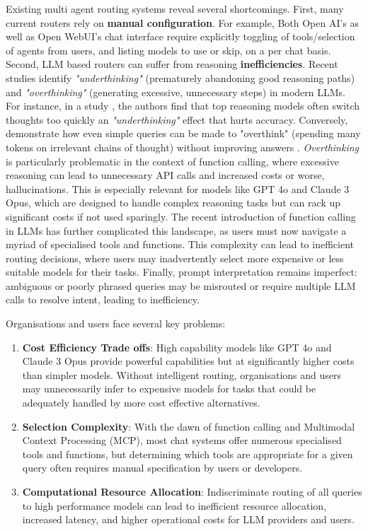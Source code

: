 Existing multi agent routing systems reveal several shortcomings. First, many current routers rely on \textbf{manual configuration}. For example, Both Open AI's as well as Open WebUI's chat interface require explicitly toggling of tools/selection of agents from users, and listing models to use or skip, on a per chat basis. Second, LLM based routers can suffer from reasoning \textbf{inefficiencies}. Recent studies identify \textit{"underthinking"} (prematurely abandoning good reasoning paths) and \textit{"overthinking"} (generating excessive, unnecessary steps) in modern LLMs. For instance, in a study \cite{wang2025thoughtsplaceunderthinkingo1like}, the authors find that top reasoning models often switch thoughts too quickly an \textit{"underthinking"} effect that hurts accuracy. Conversely, \cite{kumar2025overthinkslowdownattacksreasoning} demonstrate how even simple queries can be made to "overthink" (spending many tokens on irrelevant chains of thought) without improving answers . \textit{Overthinking} is particularly problematic in the context of function calling, where excessive reasoning can lead to unnecessary API calls and increased costs or worse, hallucinations. This is especially relevant for models like GPT 4o and Claude 3 Opus, which are designed to handle complex reasoning tasks but can rack up significant costs if not used sparingly. The recent introduction of function calling in LLMs has further complicated this landscape, as users must now navigate a myriad of specialised tools and functions. This complexity can lead to inefficient routing decisions, where users may inadvertently select more expensive or less suitable models for their tasks. Finally, prompt interpretation remains imperfect: ambiguous or poorly phrased queries may be misrouted or require multiple LLM calls to resolve intent, leading to inefficiency.

Organisations and users face several key problems:
\begin{enumerate}
    \item \textbf{Cost Efficiency Trade offs}: High capability models like GPT 4o and Claude 3 Opus provide powerful capabilities but at significantly higher costs than simpler models. Without intelligent routing, organisations and users may unnecessarily infer to expensive models for tasks that could be adequately handled by more cost effective alternatives.
    
    \item \textbf{Selection Complexity}: With the dawn of function calling and Multimodal Context Processing (MCP), most chat systems offer numerous specialised tools and functions, but determining which tools are appropriate for a given query often requires manual specification by users or developers.
    
    \item \textbf{Computational Resource Allocation}: Indiscriminate routing of all queries to high performance models can lead to inefficient resource allocation, increased latency, and higher operational costs for LLM providers and users.
\end{enumerate}

